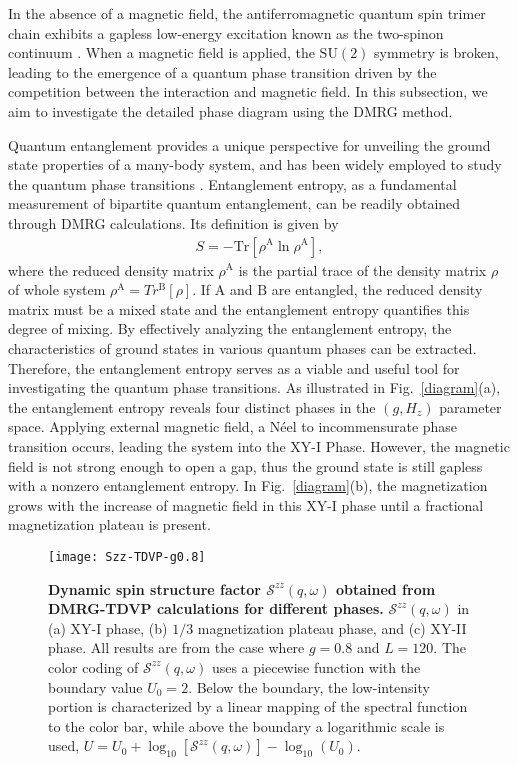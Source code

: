 \documentclass[aps,prx,showpacs,floatfix,twocolumn,superscriptaddress,nofootinbib,longbibliography]{revtex4-2}
\begin{document}
In the absence of a magnetic field, the antiferromagnetic quantum spin trimer chain exhibits a gapless low-energy excitation known as the two-spinon continuum \cite{cheng2022}.  When a magnetic field is applied, the $\mathrm{SU}(2)$ symmetry is broken, leading to the emergence of a quantum phase transition driven by the competition between the interaction and magnetic field.  In this subsection, we aim to investigate the detailed phase diagram using  the  DMRG method. 
 
 
Quantum entanglement provides a unique perspective for unveiling the ground state properties of a many-body system, and   has been widely employed to study the quantum phase transitions \cite{RevModPhys.80.517,LAFLORENCIE20161,cheng2017,PhysRevLett.120.200602,PhysRevE.97.062134,PhysRevLett.128.020402}. Entanglement entropy, as a fundamental measurement of bipartite quantum  entanglement, can be readily obtained through DMRG calculations. Its definition is given by
\begin{eqnarray}
	S=-\mathrm{Tr}\left[\rho^\mathrm{A} \ln \rho^\mathrm{A}\right],
\end{eqnarray}
where the reduced density matrix $\rho^\mathrm{A}$ is the partial trace of the density matrix $\rho$ of whole system  $\rho^\mathrm{A}=Tr^\mathrm{B}\left[\rho\right]$. If $\mathrm{A}$ and $\mathrm{B}$ are entangled, the reduced density matrix must be a mixed state and the entanglement entropy quantifies this degree of mixing. By effectively analyzing the entanglement entropy, the characteristics of ground states in various quantum phases can be extracted. Therefore, the entanglement entropy serves as a viable and useful tool for investigating the quantum phase transitions.
As illustrated in Fig.~\ref{diagram}(a), the entanglement entropy reveals 
 four distinct phases  in the $(g,H_z)$ parameter space. Applying external magnetic field, a N\'{e}el to incommensurate  phase transition occurs,  leading the system into the XY-I Phase. However, the magnetic field is not strong enough to open a gap, thus the ground state is still gapless with  a nonzero entanglement entropy. In Fig.~\ref{diagram}(b), the magnetization grows  with the increase of magnetic field in this XY-I phase until a fractional magnetization plateau is present. 


\begin{figure*}[t]
	\texttt{[image: Szz-TDVP-g0.8]}
   \caption{\label{szz-g8} \textbf{Dynamic spin structure factor $\mathcal{S}^{zz}  (q,\omega) $  obtained from DMRG-TDVP calculations for different phases.}  $\mathcal{S}^{zz}  (q,\omega) $ in  (a) XY-I phase, (b) $1/3 $ magnetization  plateau phase, and (c) XY-II phase. All results are from the case where $g=0.8$ and $L=120$. The  color coding of $\mathcal{S}^{zz} (q,\omega)$ uses a piecewise function with
   the boundary value $U_0=2$. 
   Below the boundary, the low-intensity portion is characterized by a linear mapping of the spectral
   function to the color bar, while above the boundary a logarithmic scale is used, $U=U_0+\log_{10}[\mathcal{S}^{zz}(q,\omega)]- \log_{10}(U_0)$.}
\end{figure*}
\end{document}
